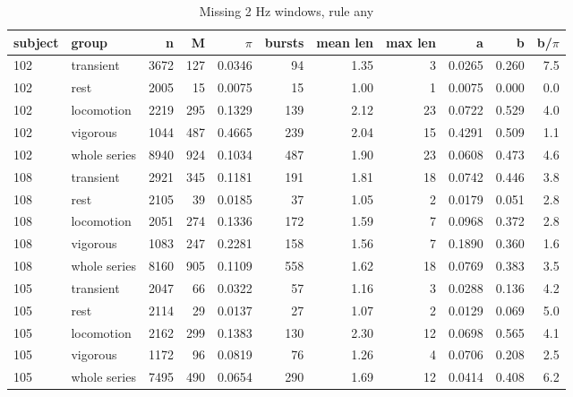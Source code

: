\begin{table}[ht]
\centering
\small
\begin{tabular}{llrrrrrrrrr}
\toprule
subject & group & n & M & $\pi$ & bursts & mean len & max len & a & b & b/$\pi$ \\
\midrule
102 & transient & 3672 & 127 & 0.0346 & 94 & 1.35 & 3 & 0.0265 & 0.260 & 7.5 \\
102 & rest & 2005 & 15 & 0.0075 & 15 & 1.00 & 1 & 0.0075 & 0.000 & 0.0 \\
102 & locomotion & 2219 & 295 & 0.1329 & 139 & 2.12 & 23 & 0.0722 & 0.529 & 4.0 \\
102 & vigorous & 1044 & 487 & 0.4665 & 239 & 2.04 & 15 & 0.4291 & 0.509 & 1.1 \\
102 & whole series & 8940 & 924 & 0.1034 & 487 & 1.90 & 23 & 0.0608 & 0.473 & 4.6 \\
108 & transient & 2921 & 345 & 0.1181 & 191 & 1.81 & 18 & 0.0742 & 0.446 & 3.8 \\
108 & rest & 2105 & 39 & 0.0185 & 37 & 1.05 & 2 & 0.0179 & 0.051 & 2.8 \\
108 & locomotion & 2051 & 274 & 0.1336 & 172 & 1.59 & 7 & 0.0968 & 0.372 & 2.8 \\
108 & vigorous & 1083 & 247 & 0.2281 & 158 & 1.56 & 7 & 0.1890 & 0.360 & 1.6 \\
108 & whole series & 8160 & 905 & 0.1109 & 558 & 1.62 & 18 & 0.0769 & 0.383 & 3.5 \\
105 & transient & 2047 & 66 & 0.0322 & 57 & 1.16 & 3 & 0.0288 & 0.136 & 4.2 \\
105 & rest & 2114 & 29 & 0.0137 & 27 & 1.07 & 2 & 0.0129 & 0.069 & 5.0 \\
105 & locomotion & 2162 & 299 & 0.1383 & 130 & 2.30 & 12 & 0.0698 & 0.565 & 4.1 \\
105 & vigorous & 1172 & 96 & 0.0819 & 76 & 1.26 & 4 & 0.0706 & 0.208 & 2.5 \\
105 & whole series & 7495 & 490 & 0.0654 & 290 & 1.69 & 12 & 0.0414 & 0.408 & 6.2 \\
\bottomrule
\end{tabular}
\caption{Missing 2 Hz windows, rule any}
\end{table}
